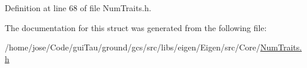 Definition at line 68 of file Num\-Traits.\-h.



The documentation for this struct was generated from the following file\-:\begin{DoxyCompactItemize}
\item 
/home/jose/\-Code/gui\-Tau/ground/gcs/src/libs/eigen/\-Eigen/src/\-Core/\hyperlink{_num_traits_8h}{Num\-Traits.\-h}\end{DoxyCompactItemize}
